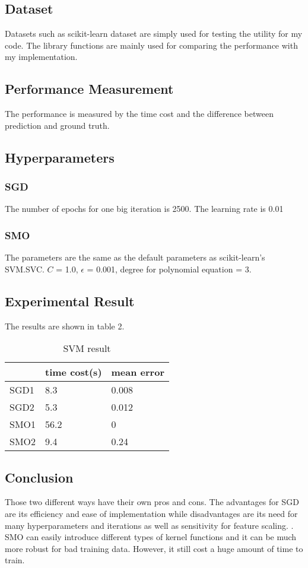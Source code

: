 \documentclass[journal,twoside,web]{ieeecolor}
\begin{document}
\subsection{Dataset}
Datasets such as scikit-learn dataset are simply used for testing the utility for my code. The library functions are mainly used for comparing the performance with my implementation.
\subsection{Performance Measurement}
The performance is measured by the time cost and the difference between prediction and ground truth.
\subsection{Hyperparameters}
\subsubsection{SGD}The number of epochs for one big iteration is 2500. The learning rate is 0.01
\subsubsection{SMO}The parameters are the same as the default parameters as scikit-learn's SVM.SVC. $C$ = 1.0, $\epsilon$ = 0.001, degree for polynomial equation = 3.
\subsection{Experimental Result}
The results are shown in table 2.
\begin{table}
\centering
\caption{SVM result}
\begin{tabular}{|l|l|l|} 
\hline
     & time cost(s) & mean error  \\ 
\hline
SGD1 & 8.3          & 0.008       \\ 
\hline
SGD2 & 5.3          & 0.012       \\ 
\hline
SMO1 & 56.2         & 0           \\ 
\hline
SMO2 & 9.4          & 0.24        \\
\hline
\end{tabular}
\end{table}


\subsection{Conclusion}
Those two different ways have their own pros and cons. The advantages for SGD are its efficiency and ease of implementation while disadvantages are its need for many hyperparameters and iterations as well as sensitivity for feature scaling. \cite{scikit-learn}. SMO can easily introduce different types of kernel functions and it can be much more robust for bad training data. However, it still cost a huge amount of time to train.




\end{document}

